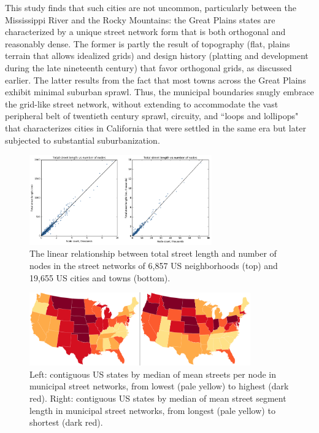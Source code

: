 \documentclass{article}
\begin{document}
This study finds that such cities are not uncommon, particularly between the Mississippi River and the Rocky Mountains: the Great Plains states are characterized by a unique street network form that is both orthogonal and reasonably dense. The former is partly the result of topography (flat, plains terrain that allows idealized grids) and design history (platting and development during the late nineteenth century) that favor orthogonal grids, as discussed earlier. The latter results from the fact that most towns across the Great Plains exhibit minimal suburban sprawl. Thus, the municipal boundaries snugly embrace the grid-like street network, without extending to accommodate the vast peripheral belt of twentieth century sprawl, circuity, and ``loops and lollipops" \cite{southworth_streets_1997} that characterizes cities in California that were settled in the same era but later subjected to substantial suburbanization.

\begin{figure}
	\includegraphics[width=0.7\textwidth]{media/fig03.png}
	\caption{The linear relationship between total street length and number of nodes in the street networks of 6,857 US neighborhoods (top) and 19,655 US cities and towns (bottom).}
	\label{fig03}
\end{figure}

\begin{figure}
	\includegraphics[width=0.85\textwidth]{media/fig04.png}
	\caption{Left: contiguous US states by median of mean streets per node in municipal street networks, from lowest (pale yellow) to highest (dark red). Right: contiguous US states by median of mean street segment length in municipal street networks, from longest (pale yellow) to shortest (dark red).}
	\label{fig04}
\end{figure}
\end{document}
